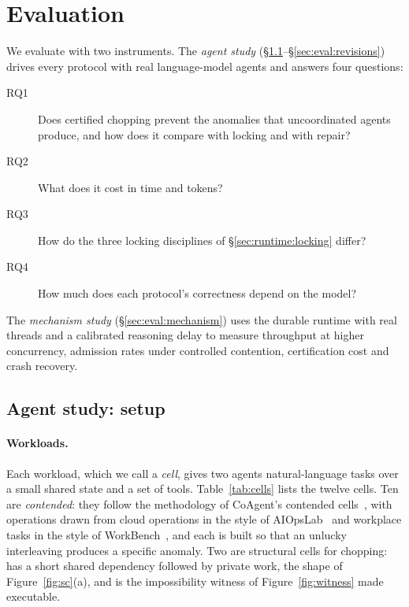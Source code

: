 \section{Evaluation}
\label{sec:eval}

We evaluate with two instruments. The \emph{agent study}
(\S\ref{sec:eval:setup}--\S\ref{sec:eval:revisions}) drives every protocol
with real language-model agents and answers four questions:
\begin{description}
\item[RQ1] Does certified chopping prevent the anomalies that uncoordinated
  agents produce, and how does it compare with locking and with repair?
\item[RQ2] What does it cost in time and tokens?
\item[RQ3] How do the three locking disciplines of
  \S\ref{sec:runtime:locking} differ?
\item[RQ4] How much does each protocol's correctness depend on the model?
\end{description}
The \emph{mechanism study} (\S\ref{sec:eval:mechanism}) uses the durable
runtime with real threads and a calibrated reasoning delay to measure
throughput at higher concurrency, admission rates under controlled
contention, certification cost and crash recovery.

\subsection{Agent study: setup}
\label{sec:eval:setup}

\paragraph{Workloads.}
Each workload, which we call a \emph{cell}, gives two agents natural-language
tasks over a small shared state and a set of tools. Table~\ref{tab:cells}
lists the twelve cells. Ten are \emph{contended}: they follow the methodology
of CoAgent's contended cells~\cite{lyu2026coagent}, with operations drawn from
cloud operations in the style of AIOpsLab~\cite{chen2025aiopslab} and
workplace tasks in the style of WorkBench~\cite{styles2024workbench}, and
each is built so that an unlucky interleaving produces a specific anomaly.
Two are structural cells for chopping:  has a short shared
dependency followed by private work, the shape of
Figure~\ref{fig:sc}(a), and  is the impossibility witness of
Figure~\ref{fig:witness} made executable.

